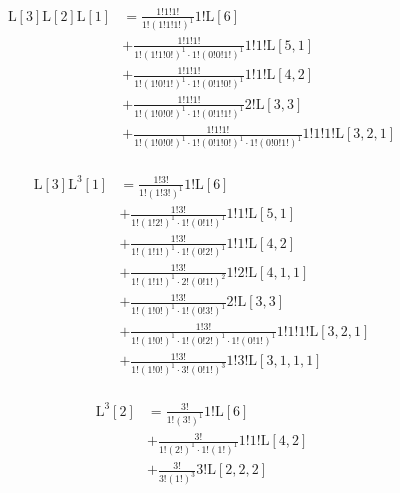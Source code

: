 \begin{equation*} \begin{aligned}
  \mathrm{L}[3] \mathrm{L}[2] \mathrm{L}[1] &=
  \frac{1!1!1!}{1!(1!1!1!)^1}
  1! \mathrm{L}[6] \\ &
+ \frac{1!1!1!}{1!(1!1!0!)^1 \cdot 1!(0!0!1!)^1}
  1!1! \mathrm{L}[5, 1] \\ &
+ \frac{1!1!1!}{1!(1!0!1!)^1 \cdot 1!(0!1!0!)^1}
  1!1! \mathrm{L}[4, 2] \\ &
+ \frac{1!1!1!}{1!(1!0!0!)^1 \cdot 1!(0!1!1!)^1}
  2! \mathrm{L}[3, 3] \\ &
+ \frac{1!1!1!}{1!(1!0!0!)^1 \cdot 1!(0!1!0!)^1 \cdot 1!(0!0!1!)^1}
  1!1!1! \mathrm{L}[3, 2, 1] \\
\end{aligned} \end{equation*}

\begin{equation*} \begin{aligned}
  \mathrm{L}[3] \mathrm{L}^3[1] &=
  \frac{1!3!}{1!(1!3!)^1}
  1! \mathrm{L}[6] \\ &
+ \frac{1!3!}{1!(1!2!)^1 \cdot 1!(0!1!)^1}
  1!1! \mathrm{L}[5, 1] \\ &
+ \frac{1!3!}{1!(1!1!)^1 \cdot 1!(0!2!)^1}
  1!1! \mathrm{L}[4, 2] \\ &
+ \frac{1!3!}{1!(1!1!)^1 \cdot 2!(0!1!)^2}
  1!2! \mathrm{L}[4, 1, 1] \\ &
+ \frac{1!3!}{1!(1!0!)^1 \cdot 1!(0!3!)^1}
  2! \mathrm{L}[3, 3] \\ &
+ \frac{1!3!}{1!(1!0!)^1 \cdot 1!(0!2!)^1 \cdot 1!(0!1!)^1}
  1!1!1! \mathrm{L}[3, 2, 1] \\ &
+ \frac{1!3!}{1!(1!0!)^1 \cdot 3!(0!1!)^3}
  1!3! \mathrm{L}[3, 1, 1, 1] \\
\end{aligned} \end{equation*}

\begin{equation*} \begin{aligned}
  \mathrm{L}^3[2] &=
  \frac{3!}{1!(3!)^1}
  1! \mathrm{L}[6] \\ &
+ \frac{3!}{1!(2!)^1 \cdot 1!(1!)^1}
  1!1! \mathrm{L}[4, 2] \\ &
+ \frac{3!}{3!(1!)^3}
  3! \mathrm{L}[2, 2, 2] \\
\end{aligned} \end{equation*}

